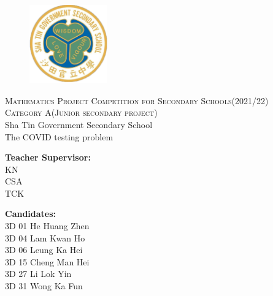 \begin{titlepage}
\begin{figure}[t]
    \centering\includegraphics[width=0.3\textwidth]{img/School.png}
\end{figure}
\begin{center}
    \textsc{ \LARGE{Mathematics Project Competition for Secondary Schools(2021/22)\\}}
	\textsc{ \LARGE{Category A(Junior secondary project)\\ }}
	\textnormal{ \LARGE{Sha Tin Government Secondary School\\}}
	\vspace{30mm}
	\fontsize{10mm}{7mm}\selectfont 
    \textup{The COVID testing problem}\\
\end{center}

\vspace{25mm}

\begin{minipage}[t]{0.47\textwidth}
	\textnormal{\large{\bf Teacher Supervisor:\\}}
	{\large KN\\CSA\\TCK}
\end{minipage}\hfill\begin{minipage}[t]{0.47\textwidth}\raggedleft
	\textnormal{\large{\bf Candidates:\\}}
	{\large 3D 01 He Huang Zhen\\3D 04 Lam Kwan Ho\\3D 06 Leung Ka Hei\\3D 15 Cheng Man Hei\\3D 27 Li Lok Yin\\3D 31 Wong Ka Fun}
\end{minipage}

\vspace{20mm}


\end{titlepage}
